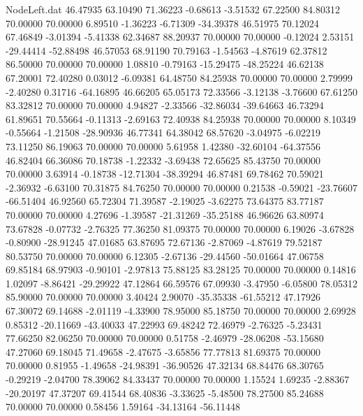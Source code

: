\begin{filecontents}{NodeLeft.dat}
  46.47935   63.10490   71.36223    -0.68613   -3.51532   67.22500   84.80312   70.00000   70.00000    6.89510   -1.36223   -6.71309  -34.39378
  46.51975   70.12024   67.46849    -3.01394   -5.41338   62.34687   88.20937   70.00000   70.00000   -0.12024    2.53151  -29.44414  -52.88498
  46.57053   68.91190   70.79163    -1.54563   -4.87619   62.37812   86.50000   70.00000   70.00000    1.08810   -0.79163  -15.29475  -48.25224
  46.62138   67.20001   72.40280     0.03012   -6.09381   64.48750   84.25938   70.00000   70.00000    2.79999   -2.40280    0.31716  -64.16895
  46.66205   65.05173   72.33566    -3.12138   -3.76600   67.61250   83.32812   70.00000   70.00000    4.94827   -2.33566  -32.86034  -39.64663
  46.73294   61.89651   70.55664    -0.11313   -2.69163   72.40938   84.25938   70.00000   70.00000    8.10349   -0.55664   -1.21508  -28.90936
  46.77341   64.38042   68.57620    -3.04975   -6.02219   73.11250   86.19063   70.00000   70.00000    5.61958    1.42380  -32.60104  -64.37556
  46.82404   66.36086   70.18738    -1.22332   -3.69438   72.65625   85.43750   70.00000   70.00000    3.63914   -0.18738  -12.71304  -38.39294
  46.87481   69.78462   70.59021    -2.36932   -6.63100   70.31875   84.76250   70.00000   70.00000    0.21538   -0.59021  -23.76607  -66.51404
  46.92560   65.72304   71.39587    -2.19025   -3.62275   73.64375   83.77187   70.00000   70.00000    4.27696   -1.39587  -21.31269  -35.25188
  46.96626   63.80974   73.67828    -0.07732   -2.76325   77.36250   81.09375   70.00000   70.00000    6.19026   -3.67828   -0.80900  -28.91245
  47.01685   63.87695   72.67136    -2.87069   -4.87619   79.52187   80.53750   70.00000   70.00000    6.12305   -2.67136  -29.44560  -50.01664
  47.06758   69.85184   68.97903    -0.90101   -2.97813   75.88125   83.28125   70.00000   70.00000    0.14816    1.02097   -8.86421  -29.29922
  47.12864   66.59576   67.09930    -3.47950   -6.05800   78.05312   85.90000   70.00000   70.00000    3.40424    2.90070  -35.35338  -61.55212
  47.17926   67.30072   69.14688    -2.01119   -4.33900   78.95000   85.18750   70.00000   70.00000    2.69928    0.85312  -20.11669  -43.40033
  47.22993   69.48242   72.46979    -2.76325   -5.23431   77.66250   82.06250   70.00000   70.00000    0.51758   -2.46979  -28.06208  -53.15680
  47.27060   69.18045   71.49658    -2.47675   -3.65856   77.77813   81.69375   70.00000   70.00000    0.81955   -1.49658  -24.98391  -36.90526
  47.32134   68.84476   68.30765    -0.29219   -2.04700   78.39062   84.33437   70.00000   70.00000    1.15524    1.69235   -2.88367  -20.20197
  47.37207   69.41544   68.40836    -3.33625   -5.48500   78.27500   85.24688   70.00000   70.00000    0.58456    1.59164  -34.13164  -56.11448

\end{filecontents}
